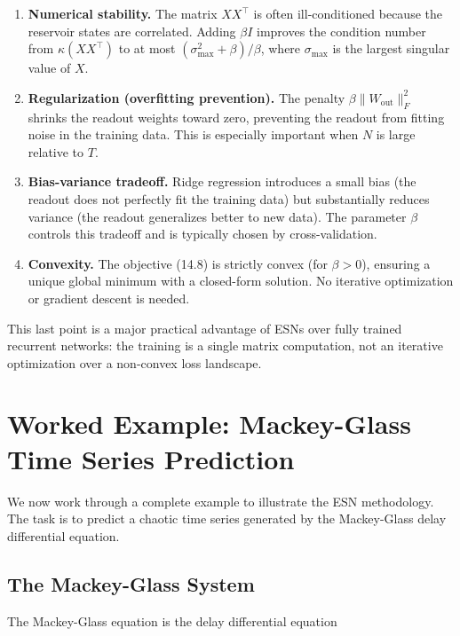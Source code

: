 \begin{enumerate}[nosep]
  \item \textbf{Numerical stability.} The matrix $XX^\top$ is often ill-conditioned because the reservoir states are correlated. Adding $\beta I$ improves the condition number from $\kappa(XX^\top)$ to at most $(\sigma_{\max}^2 + \beta)/\beta$, where $\sigma_{\max}$ is the largest singular value of $X$.

  \item \textbf{Regularization (overfitting prevention).} The penalty $\beta\|W_{\text{out}}\|_F^2$ shrinks the readout weights toward zero, preventing the readout from fitting noise in the training data. This is especially important when $N$ is large relative to $T$.

  \item \textbf{Bias-variance tradeoff.} Ridge regression introduces a small bias (the readout does not perfectly fit the training data) but substantially reduces variance (the readout generalizes better to new data). The parameter $\beta$ controls this tradeoff and is typically chosen by cross-validation.

  \item \textbf{Convexity.} The objective (14.8) is strictly convex (for $\beta > 0$), ensuring a unique global minimum with a closed-form solution. No iterative optimization or gradient descent is needed.
\end{enumerate}

This last point is a major practical advantage of ESNs over fully trained recurrent networks: the training is a single matrix computation, not an iterative optimization over a non-convex loss landscape.


\bigskip


\section{Worked Example: Mackey-Glass Time Series Prediction}\label{sec:14.6}

We now work through a complete example to illustrate the ESN methodology. The task is to predict a chaotic time series generated by the Mackey-Glass delay differential equation.

\subsection{The Mackey-Glass System}\label{sec:14.6.1}

The Mackey-Glass equation is the delay differential equation

